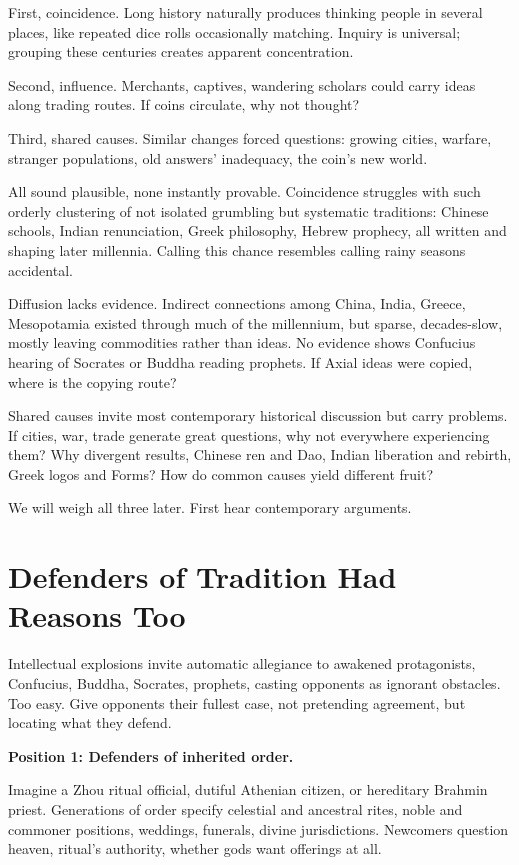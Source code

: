 First, coincidence. Long history naturally produces thinking people in several places, like repeated dice rolls occasionally matching. Inquiry is universal; grouping these centuries creates apparent concentration.

Second, influence. Merchants, captives, wandering scholars could carry ideas along trading routes. If coins circulate, why not thought?

Third, shared causes. Similar changes forced questions: growing cities, warfare, stranger populations, old answers' inadequacy, the coin's new world.

All sound plausible, none instantly provable. Coincidence struggles with such orderly clustering of not isolated grumbling but systematic traditions: Chinese schools, Indian renunciation, Greek philosophy, Hebrew prophecy, all written and shaping later millennia. Calling this chance resembles calling rainy seasons accidental.

Diffusion lacks evidence. Indirect connections among China, India, Greece, Mesopotamia existed through much of the millennium, but sparse, decades-slow, mostly leaving commodities rather than ideas. No evidence shows Confucius hearing of Socrates or Buddha reading prophets. If Axial ideas were copied, where is the copying route?

Shared causes invite most contemporary historical discussion but carry problems. If cities, war, trade generate great questions, why not everywhere experiencing them? Why divergent results, Chinese ren and Dao, Indian liberation and rebirth, Greek logos and Forms? How do common causes yield different fruit?

We will weigh all three later. First hear contemporary arguments.

\section{Defenders of Tradition Had Reasons Too}
Intellectual explosions invite automatic allegiance to awakened protagonists, Confucius, Buddha, Socrates, prophets, casting opponents as ignorant obstacles. Too easy. Give opponents their fullest case, not pretending agreement, but locating what they defend.

\textbf{Position 1: Defenders of inherited order.}

Imagine a Zhou ritual official, dutiful Athenian citizen, or hereditary Brahmin priest. Generations of order specify celestial and ancestral rites, noble and commoner positions, weddings, funerals, divine jurisdictions. Newcomers question heaven, ritual's authority, whether gods want offerings at all.

